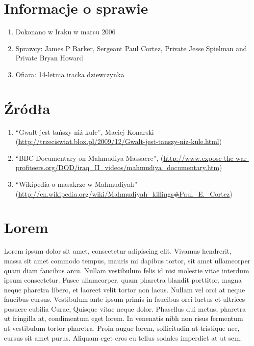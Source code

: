 \documentclass[12pt,a4paper]{article}
\begin{document}
\section{Informacje o sprawie}

\begin{enumerate}
 \item Dokonano w Iraku w marcu 2006
 \item Sprawcy: James P Barker, Sergeant Paul Cortez, Private Jesse Spielman and Private Bryan Howard
 \item Ofiara: 14-letnia iracka dziewczynka
\end{enumerate}

\section{Źródła}


\begin{enumerate}
 \item ``Gwałt jest tańszy niż kule'', Maciej Konarski (\url{http://trzeciswiat.blox.pl/2009/12/Gwalt-jest-tanszy-niz-kule.html})
 \item ``BBC Documentary on Mahmudiya Massacre'',
   (\url{http://www.expose-the-war-profiteers.org/DOD/iraq_II_videos/mahmudiya_documentary.htm})
 \item ``Wikipedia o masakrze w Mahmudiyah'' (\url{http://en.wikipedia.org/wiki/Mahmudiyah_killings#Paul_E._Cortez})
\end{enumerate}

\section{Lorem}

Lorem ipsum dolor sit amet, consectetur adipiscing elit. Vivamus
hendrerit, massa sit amet commodo tempus, mauris mi dapibus tortor,
sit amet ullamcorper quam diam faucibus arcu. Nullam vestibulum felis
id nisi molestie vitae interdum ipsum consectetur. Fusce ullamcorper,
quam pharetra blandit porttitor, magna neque pharetra libero, et
laoreet velit tortor non lacus. Nullam vel orci at neque faucibus
cursus. Vestibulum ante ipsum primis in faucibus orci luctus et
ultrices posuere cubilia Curae; Quisque vitae neque dolor. Phasellus
dui metus, pharetra ut fringilla at, condimentum eget lorem. In
venenatis nibh non risus fermentum at vestibulum tortor pharetra.
Proin augue lorem, sollicitudin at tristique nec, cursus sit amet
purus. Aliquam eget eros eu tellus sodales imperdiet at ut sem. 
\end{document}
